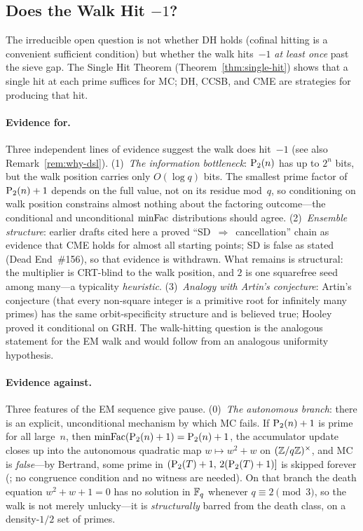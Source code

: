 \subsection{Does the Walk Hit $-1$?}
\label{sec:does-it-hit}

The irreducible open question is not whether DH holds (cofinal
hitting is a convenient sufficient condition) but whether the walk
hits~$-1$ \emph{at least once} past the sieve gap.  The Single Hit
Theorem (Theorem~\ref{thm:single-hit}) shows that a single hit at
each prime suffices for MC; DH, CCSB, and CME are strategies for
producing that hit.

\paragraph{Evidence for.}
Three independent lines of evidence suggest the walk does hit~$-1$
(see also Remark~\ref{rem:why-dsl}).
(1)~\emph{The information bottleneck}: $\mathrm{P}_{2}(n)$ has
up to $2^n$ bits, but the walk position carries only $O(\log q)$ bits.
The smallest prime factor of $\mathrm{P}_{2}(n)+1$ depends on the full
value, not on its residue mod~$q$, so conditioning on walk position
constrains almost nothing about the factoring outcome---the
conditional and unconditional $\mathrm{minFac}$ distributions should agree.
(2)~\emph{Ensemble structure}: earlier drafts cited here a proved
``SD~$\Rightarrow$~cancellation'' chain as evidence that CME holds for
almost all starting points; SD is false as stated (Dead End~\#156), so
that evidence is withdrawn.  What remains is structural: the multiplier
is CRT-blind to the walk position, and $2$ is one squarefree seed among
many---a typicality \emph{heuristic}.
(3)~\emph{Analogy with Artin's conjecture}: Artin's conjecture
(that every non-square integer is a primitive root for infinitely
many primes) has the same orbit-specificity structure and is believed
true; Hooley~\cite{Hooley1967} proved it conditional on GRH.  The
walk-hitting question is the analogous statement for the EM walk
and would follow from an analogous uniformity hypothesis.

\paragraph{Evidence against.}
Three features of the EM sequence give pause.
(0)~\emph{The autonomous branch}: there is an explicit, unconditional
mechanism by which MC fails.  If $\mathrm{P}_{2}(n)+1$ is prime for all
large~$n$, then $\mathrm{minFac}(\mathrm{P}_{2}(n)+1) = \mathrm{P}_{2}(n)+1$, the accumulator
update closes up into the autonomous quadratic map
$w \mapsto w^2 + w$ on $(\mathbb{Z}/q\mathbb{Z})^\times$, and MC is \emph{false}---by
Bertrand, some prime in $(\mathrm{P}_{2}(T)+1,\, 2(\mathrm{P}_{2}(T)+1)]$ is skipped
forever
(;
no congruence condition and no witness are needed).  On that branch the
death equation $w^2+w+1 = 0$ has no solution in $\mathbb{F}_q$ whenever
$q \equiv 2 \pmod 3$, so the walk is not merely unlucky---it is
\emph{structurally} barred from the death class, on a density-$1/2$ set
of primes.

